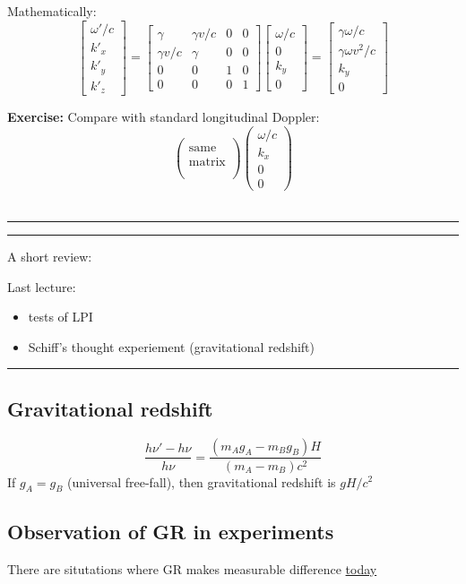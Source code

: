 \documentclass[a4paper]{article} %
\newcommand{\exercise}[2]
{
\begin{framed}
\textbf{Exercise:} #1 \\\hrule
#2
\end{framed}
}
\newcommand{\review}[1]
{
\hrule
A short review:

#1
\hrule
}
\newcommand{\bmx}[1]{
\begin{bmatrix}
#1
\end{bmatrix}
}
\newcommand{\pmx}[1]{
\begin{pmatrix}
#1
\end{pmatrix}
}
\begin{document}
Mathematically:
\begin{equation}
\bmx{\omega'/c\\k'_x\\k'_y\\k'_z}=
\bmx{
\gamma&\gamma v/c&0&0\\
\gamma v/c&\gamma&0&0\\
0&0&1&0\\
0&0&0&1
}
\bmx{
\omega/c\\0\\k_y\\0
}=
\bmx{
\gamma\omega/c\\
\gamma\omega v^2/c\\
k_y\\
0
}
\end{equation}

\exercise{Compare with standard longitudinal Doppler:
\begin{equation}
\pmx{\\\text{same}\\\text{matrix}\\\\}\pmx{\omega/c\\k_x\\0\\0}
\end{equation}
}
{}

\review{Last lecture:
\begin{itemize}
\item tests of LPI
\item Schiff's thought experiement (gravitational redshift)
\end{itemize}
}

\subsection{Gravitational redshift}
\begin{equation}
\frac{h\nu'-h\nu}{h\nu}=\frac{(m_A g_A - m_B g_B)H}{(m_A-m_B)c^2}
\end{equation}
If $g_A=g_B$ (universal free-fall), then gravitational redshift is $gH/c^2$

\subsection{Observation of GR in experiments}
There are situtations where GR makes measurable difference \underline{today}
\end{document}
